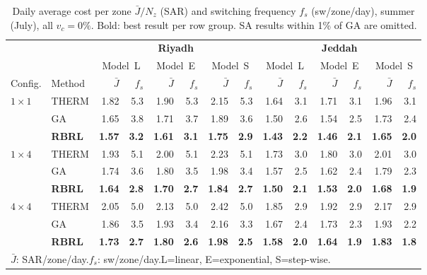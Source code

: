 \documentclass[12pt,a4paper]{article}
\renewcommand{\arraystretch}{0.93}
\newcommand{\Jbar}{\bar{J}}
\begin{document}
\begin{table}[!t]
\centering
\caption{Daily average cost per zone $\Jbar/N_z$ (SAR) and switching
frequency $f_s$ (sw/zone/day), summer (July), all $v_c=0\%$.
Bold: best result per row group. SA results within 1\% of GA are omitted.}
\label{tab:model_L}\label{tab:model_E}\label{tab:model_S}
\setlength{\tabcolsep}{2.4pt}
\renewcommand{\arraystretch}{0.92}
\begin{tabularx}{\linewidth}{@{}lXrrrrrrrrrrrr@{}}
\toprule
& & \multicolumn{6}{c}{\textbf{Riyadh}} &
    \multicolumn{6}{c}{\textbf{Jeddah}} \\
\cmidrule(lr){3-8}\cmidrule(lr){9-14}
& & \multicolumn{2}{c}{Model~L} &
    \multicolumn{2}{c}{Model~E} &
    \multicolumn{2}{c}{Model~S} &
    \multicolumn{2}{c}{Model~L} &
    \multicolumn{2}{c}{Model~E} &
    \multicolumn{2}{c}{Model~S} \\
\cmidrule(lr){3-4}\cmidrule(lr){5-6}\cmidrule(lr){7-8}
\cmidrule(lr){9-10}\cmidrule(lr){11-12}\cmidrule(lr){13-14}
Config. & Method
  & $\Jbar$ & $f_s$
  & $\Jbar$ & $f_s$
  & $\Jbar$ & $f_s$
  & $\Jbar$ & $f_s$
  & $\Jbar$ & $f_s$
  & $\Jbar$ & $f_s$ \\
\midrule
\multirow{3}{*}{$1\times1$}
  & THERM & 1.82 & 5.3 & 1.90 & 5.3 & 2.15 & 5.3
          & 1.64 & 3.1 & 1.71 & 3.1 & 1.96 & 3.1 \\
  & GA    & 1.65 & 3.8 & 1.71 & 3.7 & 1.89 & 3.6
          & 1.50 & 2.6 & 1.54 & 2.5 & 1.73 & 2.4 \\
  & \textbf{RBRL}
          & \textbf{1.57} & \textbf{3.2}
          & \textbf{1.61} & \textbf{3.1}
          & \textbf{1.75} & \textbf{2.9}
          & \textbf{1.43} & \textbf{2.2}
          & \textbf{1.46} & \textbf{2.1}
          & \textbf{1.65} & \textbf{2.0} \\
\midrule
\multirow{3}{*}{$1\times4$}
  & THERM & 1.93 & 5.1 & 2.00 & 5.1 & 2.23 & 5.1
          & 1.73 & 3.0 & 1.80 & 3.0 & 2.01 & 3.0 \\
  & GA    & 1.74 & 3.6 & 1.80 & 3.5 & 1.98 & 3.4
          & 1.57 & 2.5 & 1.62 & 2.4 & 1.79 & 2.3 \\
  & \textbf{RBRL}
          & \textbf{1.64} & \textbf{2.8}
          & \textbf{1.70} & \textbf{2.7}
          & \textbf{1.84} & \textbf{2.7}
          & \textbf{1.50} & \textbf{2.1}
          & \textbf{1.53} & \textbf{2.0}
          & \textbf{1.68} & \textbf{1.9} \\
\midrule
\multirow{3}{*}{$4\times4$}
  & THERM & 2.05 & 5.0 & 2.13 & 5.0 & 2.42 & 5.0
          & 1.85 & 2.9 & 1.92 & 2.9 & 2.17 & 2.9 \\
  & GA    & 1.86 & 3.5 & 1.93 & 3.4 & 2.16 & 3.3
          & 1.67 & 2.4 & 1.73 & 2.3 & 1.93 & 2.2 \\
  & \textbf{RBRL}
          & \textbf{1.73} & \textbf{2.7}
          & \textbf{1.80} & \textbf{2.6}
          & \textbf{1.98} & \textbf{2.5}
          & \textbf{1.58} & \textbf{2.0}
          & \textbf{1.64} & \textbf{1.9}
          & \textbf{1.83} & \textbf{1.8} \\
\bottomrule
\multicolumn{14}{l}{\footnotesize
$\Jbar$: SAR/zone/day.\quad $f_s$: sw/zone/day.\quad L=linear, E=exponential, S=step-wise.}
\end{tabularx}
\end{table}
\end{document}
